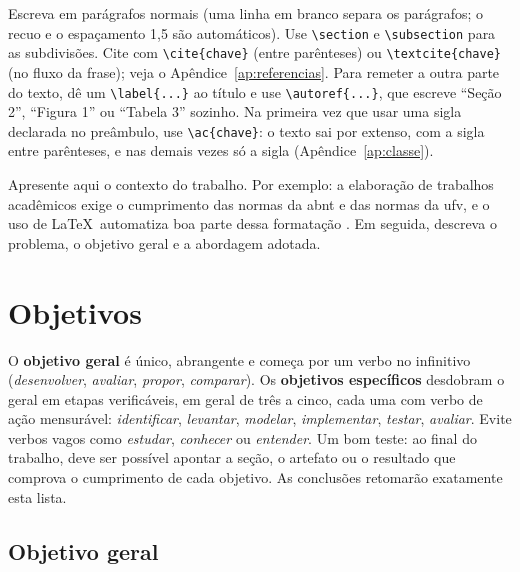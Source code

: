 \begin{dica}
Escreva em parágrafos normais (uma linha em branco separa os parágrafos; o recuo e o
espaçamento 1,5 são automáticos). Use \texttt{\textbackslash section} e
\texttt{\textbackslash subsection} para as subdivisões. Cite com
\texttt{\textbackslash cite\{chave\}} (entre parênteses) ou
\texttt{\textbackslash textcite\{chave\}} (no fluxo da frase); veja o
Apêndice~\ref{ap:referencias}. Para remeter a outra parte do texto, dê um
\texttt{\textbackslash label\{...\}} ao título e use
\texttt{\textbackslash autoref\{...\}}, que escreve ``Seção 2'', ``Figura 1'' ou
``Tabela 3'' sozinho. Na primeira vez que usar uma sigla declarada no preâmbulo, use
\texttt{\textbackslash ac\{chave\}}: o texto sai por extenso, com a sigla entre
parênteses, e nas demais vezes só a sigla (Apêndice~\ref{ap:classe}).
\end{dica}

Apresente aqui o contexto do trabalho. Por exemplo: a elaboração de trabalhos
acadêmicos exige o cumprimento das normas da \ac{abnt} e das normas da \ac{ufv}, e o
uso de \LaTeX\ automatiza boa parte dessa formatação \cite{abntex2classe,manualUFV}.
Em seguida, descreva o problema, o objetivo geral e a abordagem adotada.

\section{Objetivos}\label{sec:objetivos}

\begin{dica}
O \textbf{objetivo geral} é único, abrangente e começa por um verbo no infinitivo
(\emph{desenvolver}, \emph{avaliar}, \emph{propor}, \emph{comparar}). Os
\textbf{objetivos específicos} desdobram o geral em etapas verificáveis, em geral de
três a cinco, cada uma com verbo de ação mensurável: \emph{identificar},
\emph{levantar}, \emph{modelar}, \emph{implementar}, \emph{testar}, \emph{avaliar}.
Evite verbos vagos como \emph{estudar}, \emph{conhecer} ou \emph{entender}. Um bom teste:
ao final do trabalho, deve ser possível apontar a seção, o artefato ou o resultado que
comprova o cumprimento de cada objetivo. As conclusões retomarão exatamente esta lista.
\end{dica}

\subsection{Objetivo geral}

